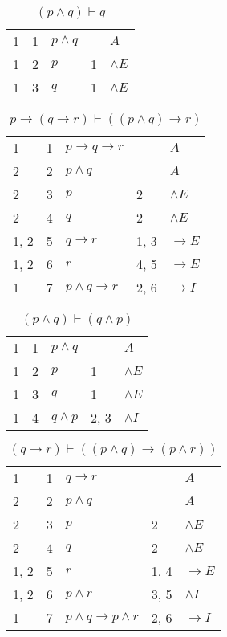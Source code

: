 \documentclass{article}
\begin{document}
\begin{table}[htbp]\caption*{$(p ∧ q) ⊢ q$}\centering\begin{tabular}{lrlll}
{1} & 1 & $p∧q$ & {} & $A$ \\
{1} & 2 & $p$ & {1} & $∧E$ \\
{1} & 3 & $q$ & {1} & $∧E$ \\
\end{tabular}
\end{table}
\begin{table}[htbp]\caption*{$p → (q → r) ⊢ ((p ∧ q) → r)$}\centering\begin{tabular}{lrlll}
{1} & 1 & $p→q→r$ & {} & $A$ \\
{2} & 2 & $p∧q$ & {} & $A$ \\
{2} & 3 & $p$ & {2} & $∧E$ \\
{2} & 4 & $q$ & {2} & $∧E$ \\
{1, 2} & 5 & $q→r$ & {1, 3} & $→E$ \\
{1, 2} & 6 & $r$ & {4, 5} & $→E$ \\
{1} & 7 & $p∧q→r$ & {2, 6} & $→I$ \\
\end{tabular}
\end{table}
\begin{table}[htbp]\caption*{$(p ∧ q) ⊢ (q ∧ p)$}\centering\begin{tabular}{lrlll}
{1} & 1 & $p∧q$ & {} & $A$ \\
{1} & 2 & $p$ & {1} & $∧E$ \\
{1} & 3 & $q$ & {1} & $∧E$ \\
{1} & 4 & $q∧p$ & {2, 3} & $∧I$ \\
\end{tabular}
\end{table}
\begin{table}[htbp]\caption*{$(q → r) ⊢ ((p ∧ q) → (p ∧ r))$}\centering\begin{tabular}{lrlll}
{1} & 1 & $q→r$ & {} & $A$ \\
{2} & 2 & $p∧q$ & {} & $A$ \\
{2} & 3 & $p$ & {2} & $∧E$ \\
{2} & 4 & $q$ & {2} & $∧E$ \\
{1, 2} & 5 & $r$ & {1, 4} & $→E$ \\
{1, 2} & 6 & $p∧r$ & {3, 5} & $∧I$ \\
{1} & 7 & $p∧q→p∧r$ & {2, 6} & $→I$ \\
\end{tabular}
\end{table}
\end{document}
